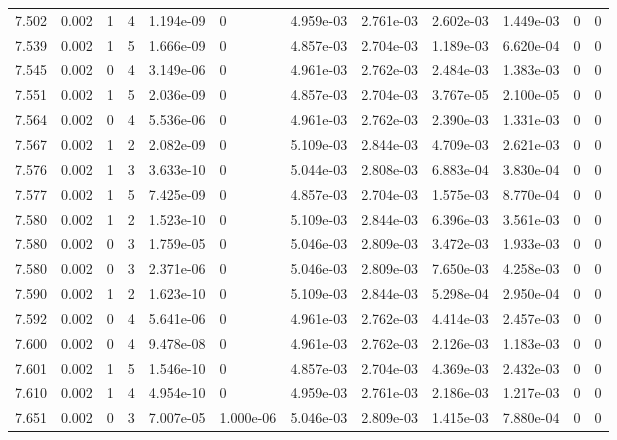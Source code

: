 \documentclass[preview]{standalone}
\begin{document}
{{{{{{{{{{\begin{tabular}{L{1.2cm}C{1.2cm} C{0.3cm}C{0.5cm} C{1.4cm}C{1.4cm} C{1.4cm}C{1.4cm} C{1.6cm}C{1.6cm} C{1.6cm}C{1.6cm}}
  7.502  &  0.002  & 1     &  4 &  1.194e-09  & 0  &  4.959e-03&   2.761e-03& 2.602e-03 & 1.449e-03   &  0 & 0  \\ 
  7.539  &  0.002  & 1     &  5 &  1.666e-09  & 0  &  4.857e-03&   2.704e-03& 1.189e-03 & 6.620e-04   &  0 & 0  \\ 
  7.545  &  0.002  & 0     &  4 &  3.149e-06  & 0  &  4.961e-03&   2.762e-03& 2.484e-03 & 1.383e-03   &  0 & 0  \\ 
  7.551  &  0.002  & 1     &  5 &  2.036e-09  & 0  &  4.857e-03&   2.704e-03& 3.767e-05 & 2.100e-05   &  0 & 0  \\ 
  7.564  &  0.002  & 0     &  4 &  5.536e-06  & 0  &  4.961e-03&   2.762e-03& 2.390e-03 & 1.331e-03   &  0 & 0  \\ 
  7.567  &  0.002  & 1     &  2 &  2.082e-09  & 0  &  5.109e-03&   2.844e-03& 4.709e-03 & 2.621e-03   &  0 & 0  \\ 
  7.576  &  0.002  & 1     &  3 &  3.633e-10  & 0  &  5.044e-03&   2.808e-03& 6.883e-04 & 3.830e-04   &  0 & 0  \\ 
  7.577  &  0.002  & 1     &  5 &  7.425e-09  & 0  &  4.857e-03&   2.704e-03& 1.575e-03 & 8.770e-04   &  0 & 0  \\ 
  7.580  &  0.002  & 1     &  2 &  1.523e-10  & 0  &  5.109e-03&   2.844e-03& 6.396e-03 & 3.561e-03   &  0 & 0  \\ 
  7.580  &  0.002  & 0     &  3 &  1.759e-05  & 0  &  5.046e-03&   2.809e-03& 3.472e-03 & 1.933e-03   &  0 & 0  \\ 
  7.580  &  0.002  & 0     &  3 &  2.371e-06  & 0  &  5.046e-03&   2.809e-03& 7.650e-03 & 4.258e-03   &  0 & 0  \\ 
  7.590  &  0.002  & 1     &  2 &  1.623e-10  & 0  &  5.109e-03&   2.844e-03& 5.298e-04 & 2.950e-04   &  0 & 0  \\ 
  7.592  &  0.002  & 0     &  4 &  5.641e-06  & 0  &  4.961e-03&   2.762e-03& 4.414e-03 & 2.457e-03   &  0 & 0  \\ 
  7.600  &  0.002  & 0     &  4 &  9.478e-08  & 0  &  4.961e-03&   2.762e-03& 2.126e-03 & 1.183e-03   &  0 & 0  \\ 
  7.601  &  0.002  & 1     &  5 &  1.546e-10  & 0  &  4.857e-03&   2.704e-03& 4.369e-03 & 2.432e-03   &  0 & 0  \\ 
  7.610  &  0.002  & 1     &  4 &  4.954e-10  & 0  &  4.959e-03&   2.761e-03& 2.186e-03 & 1.217e-03   &  0 & 0  \\ 
  7.651  &  0.002  & 0     &  3 &  7.007e-05  & 1.000e-06  &  5.046e-03&   2.809e-03& 1.415e-03 & 7.880e-04   &  0 & 0  \\ 

\end{tabular}}}}}}}}}}}
\end{document}
